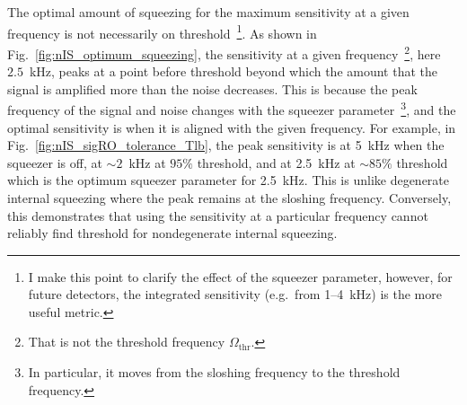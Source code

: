 The optimal amount of squeezing for the maximum sensitivity at a given frequency is not necessarily on threshold~\footnote{I make this point to clarify the effect of the squeezer parameter, however, for future detectors, the integrated sensitivity (e.g.\ from 1--4~kHz) is the more useful metric.}. As shown in Fig.~\ref{fig:nIS_optimum_squeezing}, the sensitivity at a given frequency~\footnote{That is not the threshold frequency $\Omega_\text{thr}$.}, here $2.5$~kHz, peaks at a point before threshold beyond which the amount that the signal is amplified more than the noise decreases.
This is because the peak frequency of the signal and noise changes with the squeezer parameter~\footnote{In particular, it moves from the sloshing frequency to the threshold frequency.}, and the optimal sensitivity is when it is aligned with the given frequency. For example, in Fig.~\ref{fig:nIS_sigRO_tolerance_Tlb}, the peak sensitivity is at 5~kHz when the squeezer is off, at $\sim2$~kHz at $95\%$ threshold, and at 2.5~kHz at $\sim85\%$ threshold which is the optimum squeezer parameter for 2.5~kHz.
This is unlike degenerate internal squeezing where the peak remains at the sloshing frequency. %
Conversely, this demonstrates that using the sensitivity at a particular frequency cannot reliably find threshold for nondegenerate internal squeezing. %

